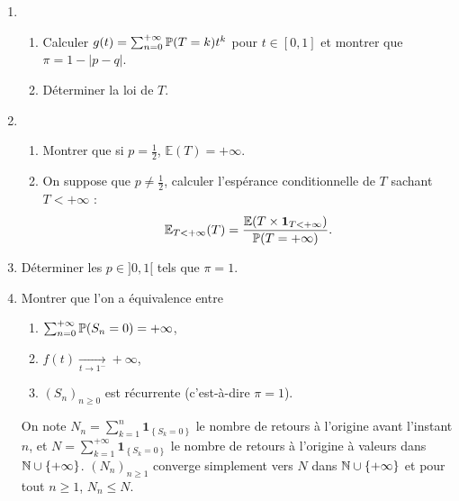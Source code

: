 \documentclass[12pt]{article}
\begin{document}
\begin{exercise}
\begin{enumerate}
        \item 
        \begin{enumerate}
            \item Calculer $g(t)=\sum_{n=0}^{+\infty}\P(T=k)t^{k}$ pour $t\in[0,1]$ et montrer que $\pi=1-\left\lvert p-q\right\rvert$.
            \item Déterminer la loi de $T$.
        \end{enumerate}

        \item 
        \begin{enumerate}
            \item Montrer que si $p=\frac{1}{2}$, $\mathbb{E}(T)=+\infty$.
            \item On suppose que $p\neq\frac{1}{2}$, calculer l'espérance conditionnelle de $T$ sachant $T<+\infty$ : 
            \begin{equation}
                \mathbb{E}_{T<+\infty}(T)=\frac{\mathbb{E}(T\times \mathbf{1}_{T<+\infty})}{\P(T=+\infty)}.
            \end{equation}
        \end{enumerate}

        \item Déterminer les $p\in]0,1[$ tels que $\pi =1$.
        \item Montrer que l'on a équivalence entre 
        \begin{enumerate}[label=(\roman*)]
            \item $\sum_{n=0}^{+\infty}\P(S_n=0)=+\infty$,
            \item $f(t)\xrightarrow[t\to1^{-}]{}+\infty$,
            \item $(S_n)_{n\geqslant0}$ est récurrente (c'est-à-dire $\pi=1$).
        \end{enumerate}

        On note $N_n=\sum_{k=1}^{n}\mathbf{1}_{\left\lbrace S_k=0\right\rbrace}$ le nombre de retours à l'origine avant l'instant $n$, et $N=\sum_{k=1}^{+\infty}\mathbf{1}_{\left\lbrace S_k=0\right\rbrace}$ le nombre de retours à l'origine à valeurs dans $\N\cup\left\lbrace+\infty\right\rbrace$. $(N_n)_{n\geqslant1}$ converge simplement vers $N$ dans $\N\cup\left\lbrace+\infty\right\rbrace$ et pour tout $n\geqslant1$, $N_n\leqslant N$.


\end{enumerate}
\end{exercise}
\end{document}
